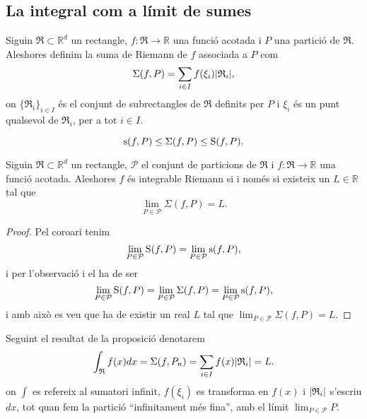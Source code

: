 \documentclass[../Apunts.tex]{subfiles}
\begin{document}
	\subsection{La integral com a límit de sumes}
	\begin{definition}
		\label{def:Suma de Riemann}
		Siguin \(\mathfrak{R}\subset\mathbb{R}^{d}\) un rectangle, \(f\colon\mathfrak{R}\to\mathbb{R}\) una funció acotada i \(P\) una partició de \(\mathfrak{R}\). Aleshores definim la suma de Riemann de \(f\) associada a \(P\) com
		\[\Sigma(f,P)=\sum_{i\in I}f(\xi_{i})\abs{\mathfrak{R}_{i}},\]
		on \(\{\mathfrak{R}_{i}\}_{i\in I}\) és el conjunt de subrectangles de \(\mathfrak{R}\) definits per \(P\) i \(\xi_{i}\) és un punt qualsevol de \(\mathfrak{R}_{i}\), per a tot \(i\in I\).
	\end{definition}
	\begin{observation}
		\label{obs:Sumes inferior i superior i suma de riemann}
		\[\operatorname{s}(f,P)\leq\Sigma(f,P)\leq\operatorname{S}(f,P).\]
	\end{observation}
	\begin{proposition}
		\label{prop:Integrable Riemann iff existeix la suma}
		Siguin \(\mathfrak{R}\subset\mathbb{R}^{d}\) un rectangle, \(\mathcal{P}\) el conjunt de particions de \(\mathfrak{R}\) i \(f\colon\mathfrak{R}\to\mathbb{R}\) una funció acotada. Aleshores \(f\) és integrable Riemann si i només si existeix un \(L\in\mathbb{R}\) tal que
		\[\lim_{P\in\mathcal{P}}\Sigma(f,P)=L.\]
		\begin{proof}
			Pel coro{\lgem}ari  tenim
			\[\lim_{P\in\mathcal{P}}\operatorname{S}(f,P)=\lim_{P\in\mathcal{P}}\operatorname{s}(f,P),\]
			i per l'observació  i el  ha de ser
			\[\lim_{P\in\mathcal{P}}\operatorname{S}(f,P)=\lim_{P\in\mathcal{P}}\Sigma(f,P)=\lim_{P\in\mathcal{P}}\operatorname{s}(f,P),\]
			i amb això es veu que ha de existir un real \(L\) tal que \(\lim_{P\in\mathcal{P}}\Sigma(f,P)=L\).
		\end{proof}
	\end{proposition}
	\begin{notation}
		Seguint el resultat de la proposició  denotarem
		\[\int_{\mathfrak{R}}f(x)dx=\Sigma(f,P_{n})=\sum_{i\in I}f(x)\abs{\mathfrak{R}_{i}}=L.\]
		on \(\int\) es refereix al sumatori infinit, \(f(\xi_{i})\) es transforma en \(f(x)\) i \(\abs{\mathfrak{R}_{i}}\) s'escriu \(dx\), tot quan fem la partició ``infinitament més fina'', amb el límit \(\lim_{P\in\mathcal{P}}P\).%
	\end{notation}
\end{document}
